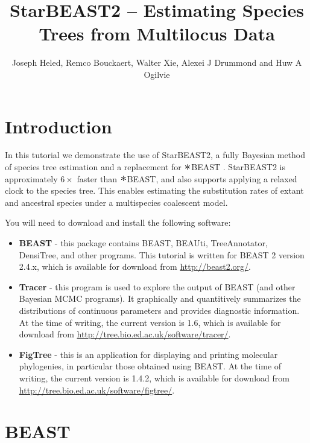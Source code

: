 \documentclass{article}
\newcommand{\BEASTVersion}{2.4.x}
\newcommand{\TracerVersion}{1.6}
\newcommand{\FigTreeVersion}{1.4.2}
\newcommand{\Conv}{\mathop{\scalebox{1.5}{$\ast$}}}
\begin{document}
\title{StarBEAST2 -- Estimating Species Trees from Multilocus Data}

\author{Joseph Heled, Remco Bouckaert, Walter Xie, Alexei J Drummond and Huw A Ogilvie}

\maketitle

\section{Introduction}

In this tutorial we demonstrate the use of StarBEAST2, a fully Bayesian method
of species tree estimation and a replacement for $\Conv$BEAST
\citep{Heled01032010}. StarBEAST2 is approximately $6\times$ faster than $\Conv$BEAST,
and also supports applying a relaxed clock to the species tree. This enables
estimating the substitution rates of extant and ancestral species under a
multispecies coalescent model.

You will need to download and install the following software:

\begin{itemize}
\item \textbf{BEAST} - this package contains BEAST, BEAUti,
TreeAnnotator, DensiTree, and other programs. This tutorial is written
for BEAST 2 \citep{10.1371/journal.pcbi.1003537} version {\BEASTVersion}, which is available for download from
\url{http://beast2.org/}.
\item \textbf{Tracer} - this program is used to explore the output of BEAST (and
other Bayesian MCMC programs). It graphically and quantitively summarizes the
distributions of continuous parameters and provides diagnostic information. At
the time of writing, the current version is {\TracerVersion}, which is available
for download from \url{http://tree.bio.ed.ac.uk/software/tracer/}.
\item \textbf{FigTree} - this is an application for displaying and printing
molecular phylogenies, in particular those obtained using BEAST. At the time of
writing, the current version is {\FigTreeVersion}, which is available for download
from \url{http://tree.bio.ed.ac.uk/software/figtree/}.
\end{itemize}

\section{BEAST}
\end{document}
